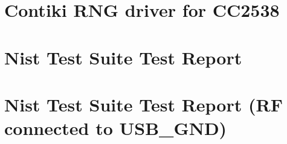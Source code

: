\section{Contiki RNG driver for CC2538} \label{ContikiRngDriver}


\section{Nist Test Suite Test Report} \label{NistTestReport}


\section{Nist Test Suite Test Report (RF connected to USB\_GND)} \label{GroundedReport}

